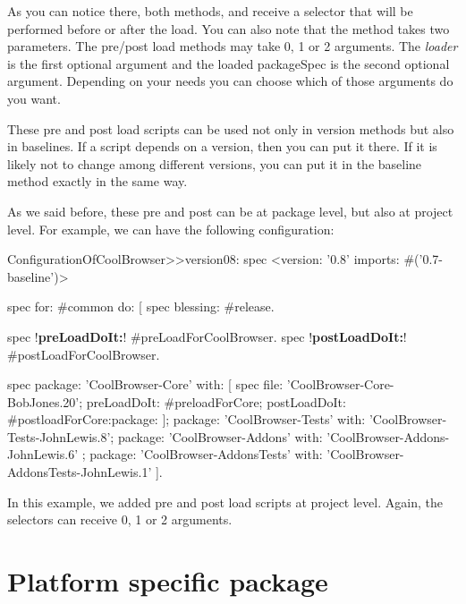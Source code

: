 \documentclass[a4paper,10pt,twoside]{book}
\begin{document}
As you can notice there, both methods,  and  receive a selector that will be performed before or after the load. You can also note that the method   takes two parameters. The pre/post load methods may take 0, 1 or 2 arguments. The {\em loader} %
is the first optional argument and the loaded packageSpec is the second optional argument. Depending on your needs you can choose which of those arguments do you want.

These pre and post load scripts can be used not only in version methods but also in baselines. If a script depends on a version, then you can put it there. If it is likely not to change among different versions, you can put it in the baseline method exactly in the same way.

As we said before, these pre and post can be at package level, but also at project level. For example, we can have the following configuration:

\begin{code}{} 
ConfigurationOfCoolBrowser>>version08: spec 
       <version: '0.8' imports: #('0.7-baseline')>
       
       spec for: #common do: [
              spec blessing: #release.
              
              spec !\textbf{preLoadDoIt:}! #preLoadForCoolBrowser.
              spec !\textbf{postLoadDoIt:}! #postLoadForCoolBrowser.
       
              spec 
                     package: 'CoolBrowser-Core' with: [
                            spec 
                                   file: 'CoolBrowser-Core-BobJones.20';
                                   preLoadDoIt: #preloadForCore;
                                   postLoadDoIt: #postloadForCore:package: ];
                     package: 'CoolBrowser-Tests' with: 'CoolBrowser-Tests-JohnLewis.8';
                     package: 'CoolBrowser-Addons' with: 'CoolBrowser-Addons-JohnLewis.6' ;
                     package: 'CoolBrowser-AddonsTests' with: 'CoolBrowser-AddonsTests-JohnLewis.1' ].
\end{code}

In this example, we added pre and post load scripts at project level. Again, the selectors can receive 0, 1 or 2 arguments. 


\section {Platform specific package}
\end{document}
